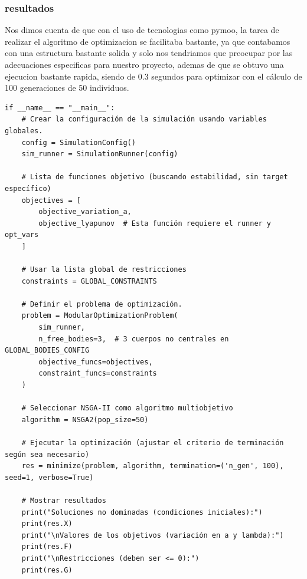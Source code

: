 \subsubsection{resultados}
Nos dimos cuenta de que con el uso de tecnologias como pymoo, la tarea de realizar el algoritmo de optimizacion se facilitaba bastante, ya que contabamos con una estructura bastante solida y solo nos tendriamos que preocupar por las adecuaciones especificas para nuestro proyecto, ademas de que se obtuvo una ejecucion bastante rapida, siendo de 0.3 segundos para optimizar con el cálculo de 100 generaciones de 50 individuos.

\begin{listing}[H]
\begin{verbatim}
if __name__ == "__main__":
    # Crear la configuración de la simulación usando variables globales.
    config = SimulationConfig()
    sim_runner = SimulationRunner(config)

    # Lista de funciones objetivo (buscando estabilidad, sin target específico)
    objectives = [
        objective_variation_a,
        objective_lyapunov  # Esta función requiere el runner y opt_vars
    ]

    # Usar la lista global de restricciones
    constraints = GLOBAL_CONSTRAINTS

    # Definir el problema de optimización.
    problem = ModularOptimizationProblem(
        sim_runner,
        n_free_bodies=3,  # 3 cuerpos no centrales en GLOBAL_BODIES_CONFIG
        objective_funcs=objectives,
        constraint_funcs=constraints
    )

    # Seleccionar NSGA-II como algoritmo multiobjetivo
    algorithm = NSGA2(pop_size=50)

    # Ejecutar la optimización (ajustar el criterio de terminación según sea necesario)
    res = minimize(problem, algorithm, termination=('n_gen', 100), seed=1, verbose=True)

    # Mostrar resultados
    print("Soluciones no dominadas (condiciones iniciales):")
    print(res.X)
    print("\nValores de los objetivos (variación en a y lambda):")
    print(res.F)
    print("\nRestricciones (deben ser <= 0):")
    print(res.G)
\end{verbatim}
\caption{Sección principal del script de optimización multi-objetivo}
\label{lst:main_optimization}
\end{listing}
